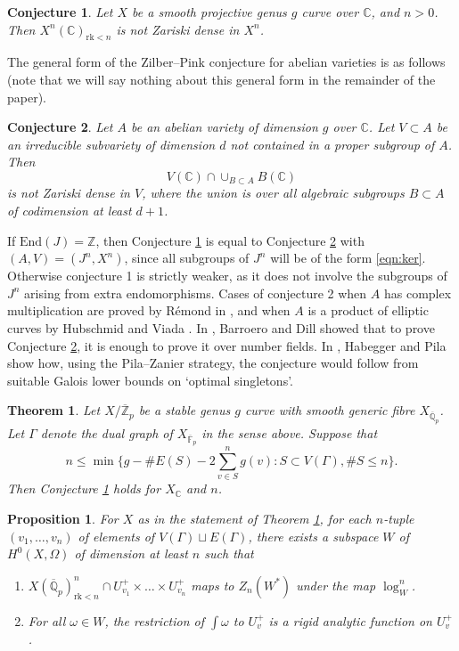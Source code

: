 \documentclass[10pt,a4paper]{amsart}
\newtheorem{conjecture}{Conjecture}
\newtheorem{theorem}{Theorem}
\newtheorem{proposition}{Proposition}
\def\C{\mathbb C}
\newcommand{\End}{\mathrm{End}}
\newcommand{\F}{\mathbb{F}}
\def\Q{\mathbb Q}
\def\Z{\mathbb Z}
\newcommand{\rk}{\mathrm{rk}}
\begin{document}
\begin{conjecture}\label{conj1}
Let $X$ be a smooth projective genus $g$ curve over $\mathbb{C}$, and $n>0$. Then $X^n (\mathbb{C})_{\rk <n}$ is not Zariski dense in $X^n$.
\end{conjecture}
The general form of the Zilber--Pink conjecture for abelian varieties is as follows (note that we will say nothing about this general form in the remainder of the paper).
\begin{conjecture}\label{conj2}
Let $A$ be an abelian variety of dimension $g$ over $\mathbb{C}$. Let $V\subset A$ be an irreducible subvariety of dimension $d$ not contained in a proper subgroup of $A$. Then 
\[
V(\C )\cap \cup _{B\subset A}B(\C )
\]
is not Zariski dense in $V$, where the union is over all algebraic subgroups $B\subset A$ of codimension at least $d+1$.
\end{conjecture}
If $\End (J)=\Z $, then Conjecture \ref{conj1} is equal to Conjecture \ref{conj2} with $(A,V)=(J^n ,X^n )$, since all subgroups of $J^n$ will be of the form \eqref{eqn:ker}. Otherwise conjecture 1 is strictly weaker, as it does not involve the subgroups of $J^n$ arising from extra endomorphisms. Cases of conjecture 2 when $A$ has complex multiplication are proved by R\'emond in \cite{rem3}, and when $A$ is a product of elliptic curves by Hubschmid and Viada \cite{HV}. In \cite{BD22}, Barroero and Dill showed that to prove Conjecture \ref{conj2}, it is enough to prove it over number fields. In \cite{HP}, Habegger and Pila show how, using the Pila--Zanier strategy, the conjecture would follow from suitable Galois lower bounds on `optimal singletons'.

\begin{theorem}\label{thm:main1}
Let $X/\overline{\Z }_p $ be a stable genus $g$ curve with smooth generic fibre $X_{\overline{\Q }_p }$. Let $\Gamma $ denote the dual graph of $X_{\overline{\F }_p }$ in the sense above. Suppose that
\[
n\leq \min \{g-\# E(S)-2\sum _{v\in S}^n g(v ):S\subset V(\Gamma ), \# S\leq n \}.
\]
Then Conjecture \ref{conj1} holds for $X_{\mathbb{C}}$ and $n$.
\end{theorem}

\begin{proposition}\label{prop1}
For $X$ as in the statement of Theorem \ref{thm:main1}, for each $n$-tuple $(v_1 ,\ldots ,v_n )$ of elements of $V(\Gamma ) \sqcup E(\Gamma )$, there exists a subspace $W$ of $H^0 (X,\Omega )$ of dimension at least $n$ such that
\begin{enumerate}
\item $X(\overline{\Q }_p )^n _{\rk <n} \cap U_{v_1 }^+ \times \ldots \times U_{v_n }^+ $ maps to $Z_n (W^* )$ under the map $\log _{W}^n $.
\item For all $\omega \in W$, the restriction of $\int \omega $ to $U_v ^+ $ is a rigid analytic function on $U_v ^+ $.
\end{enumerate}
\end{proposition}
\end{document}
